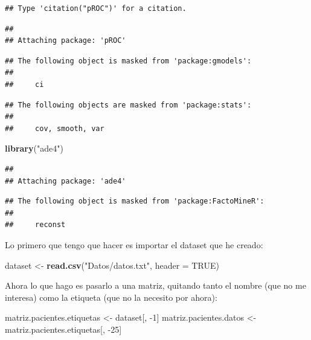 \documentclass[]{article}
\newenvironment{Shaded}{\begin{snugshade}}{\end{snugshade}}
\newcommand{\DataTypeTok}[1]{\textcolor[rgb]{0.13,0.29,0.53}{#1}}
\newcommand{\DecValTok}[1]{\textcolor[rgb]{0.00,0.00,0.81}{#1}}
\newcommand{\KeywordTok}[1]{\textcolor[rgb]{0.13,0.29,0.53}{\textbf{#1}}}
\newcommand{\NormalTok}[1]{#1}
\newcommand{\OtherTok}[1]{\textcolor[rgb]{0.56,0.35,0.01}{#1}}
\newcommand{\StringTok}[1]{\textcolor[rgb]{0.31,0.60,0.02}{#1}}
\begin{document}
\begin{verbatim}
## Type 'citation("pROC")' for a citation.
\end{verbatim}

\begin{verbatim}
## 
## Attaching package: 'pROC'
\end{verbatim}

\begin{verbatim}
## The following object is masked from 'package:gmodels':
## 
##     ci
\end{verbatim}

\begin{verbatim}
## The following objects are masked from 'package:stats':
## 
##     cov, smooth, var
\end{verbatim}

\begin{Shaded}
\begin{Highlighting}[]
\KeywordTok{library}\NormalTok{(}\StringTok{"ade4"}\NormalTok{)}
\end{Highlighting}
\end{Shaded}

\begin{verbatim}
## 
## Attaching package: 'ade4'
\end{verbatim}

\begin{verbatim}
## The following object is masked from 'package:FactoMineR':
## 
##     reconst
\end{verbatim}

Lo primero que tengo que hacer es importar el dataset que he creado:

\begin{Shaded}
\begin{Highlighting}[]
\NormalTok{dataset <-}\StringTok{ }\KeywordTok{read.csv}\NormalTok{(}\StringTok{"Datos/datos.txt"}\NormalTok{, }\DataTypeTok{header =} \OtherTok{TRUE}\NormalTok{)}
\end{Highlighting}
\end{Shaded}

Ahora lo que hago es pasarlo a una matriz, quitando tanto el nombre (que
no me interesa) como la etiqueta (que no la necesito por ahora):

\begin{Shaded}
\begin{Highlighting}[]
\NormalTok{matriz.pacientes.etiquetas <-}\StringTok{ }\NormalTok{dataset[, }\DecValTok{-1}\NormalTok{]}
\NormalTok{matriz.pacientes.datos <-}\StringTok{ }\NormalTok{matriz.pacientes.etiquetas[, }\DecValTok{-25}\NormalTok{]}
\end{Highlighting}
\end{Shaded}
\end{document}
